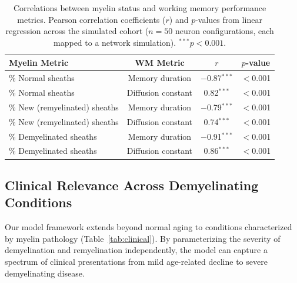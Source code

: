 \documentclass[11pt]{article}
\begin{document}
\begin{table}[H]
\centering
\caption{Correlations between myelin status and working memory performance metrics. Pearson correlation coefficients ($r$) and $p$-values from linear regression across the simulated cohort ($n = 50$ neuron configurations, each mapped to a network simulation). $^{\ast\ast\ast}p<0.001$.}
\label{tab:myelin_correlations}
\begin{tabular}{lccc}
\toprule
\textbf{Myelin Metric} & \textbf{WM Metric} & \textbf{$r$} & \textbf{$p$-value} \\
\midrule
\% Normal sheaths & Memory duration & $-$0.87$^{\ast\ast\ast}$ & $<$0.001 \\
\% Normal sheaths & Diffusion constant & 0.82$^{\ast\ast\ast}$ & $<$0.001 \\
\% New (remyelinated) sheaths & Memory duration & $-$0.79$^{\ast\ast\ast}$ & $<$0.001 \\
\% New (remyelinated) sheaths & Diffusion constant & 0.74$^{\ast\ast\ast}$ & $<$0.001 \\
\% Demyelinated sheaths & Memory duration & $-$0.91$^{\ast\ast\ast}$ & $<$0.001 \\
\% Demyelinated sheaths & Diffusion constant & 0.86$^{\ast\ast\ast}$ & $<$0.001 \\
\bottomrule
\end{tabular}
\end{table}

\subsection{Clinical Relevance Across Demyelinating Conditions}

Our model framework extends beyond normal aging to conditions characterized by myelin pathology (Table~\ref{tab:clinical}). By parameterizing the severity of demyelination and remyelination independently, the model can capture a spectrum of clinical presentations from mild age-related decline to severe demyelinating disease.
\end{document}

